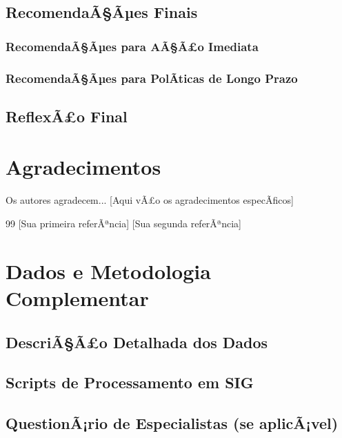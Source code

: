 \documentclass[12pt, a4paper]{article}
\begin{document}
\subsection{RecomendaÃ§Ãµes Finais}
\subsubsection{RecomendaÃ§Ãµes para AÃ§Ã£o Imediata}
\subsubsection{RecomendaÃ§Ãµes para PolÃ­ticas de Longo Prazo}

\subsection{ReflexÃ£o Final}

\section*{Agradecimentos}
Os autores agradecem... [Aqui vÃ£o os agradecimentos especÃ­ficos]

\begin{thebibliography}{99}
\bibitem{} [Sua primeira referÃªncia]
\bibitem{} [Sua segunda referÃªncia]
\end{thebibliography}

\appendix
\section{Dados e Metodologia Complementar}
\subsection{DescriÃ§Ã£o Detalhada dos Dados}
\subsection{Scripts de Processamento em SIG}
\subsection{QuestionÃ¡rio de Especialistas (se aplicÃ¡vel)}
\end{document}
